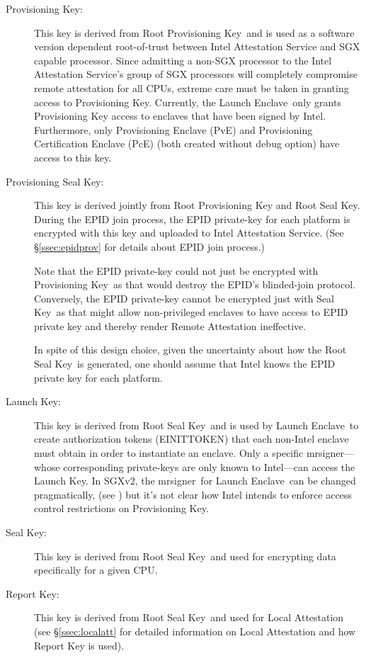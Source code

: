 \documentclass[letterpaper]{article}
\newcommand{\secref}[1]{\S\ref{#1}}
\newcommand{\mrsigner}{\textsf{mrsigner}}
\newcommand{\pve}{\textsf{PvE}}
\newcommand{\pce}{\textsf{PcE}}
\newcommand{\launchenclave}{\textsf{Launch Enclave}}
\newcommand{\rpk}{\textsf{Root Provisioning Key}}
\newcommand{\pk}{\textsf{Provisioning Key}}
\newcommand{\psk}{\textsf{Provisioning Seal Key}}
\newcommand{\rsk}{\textsf{Root Seal Key}}
\newcommand{\sk}{\textsf{Seal Key}}
\newcommand{\lk}{\textsf{Launch Key}}
\newcommand{\rk}{\textsf{Report Key}}
\begin{document}
  \begin{description}
  \item[\pk:] This key is derived from \rpk\ and is used as a software
    version dependent root-of-trust between Intel Attestation Service
    and SGX capable processor. Since admitting a non-SGX processor to
    the Intel Attestation Service's group of SGX processors will
    completely compromise remote attestation for all CPUs, extreme
    care must be taken in granting access to Provisioning
    Key. Currently, the \launchenclave\ only grants Provisioning Key
    access to enclaves that have been signed by Intel. Furthermore,
    only \textsf{Provisioning Enclave} (\pve) and Provisioning
    Certification Enclave (\pce) (both created without debug option)
    have access to this key.

  \item[\psk:] This key is derived jointly from Root Provisioning Key
    and Root Seal Key. During the EPID join process, the EPID
    private-key for each platform is encrypted with this key and
    uploaded to Intel Attestation Service. (See \secref{ssec:epidprov}
    for details about EPID join process.)

    Note that the EPID private-key could not just be encrypted with
    \pk\ as that would destroy the EPID's blinded-join
    protocol. Conversely, the EPID private-key cannot be encrypted
    just with \sk\ as that might allow non-privileged enclaves to have
    access to EPID private key and thereby render Remote Attestation
    ineffective.

    In spite of this design choice, given the uncertainty about how
    the \rsk\ is generated, one should assume that Intel knows the
    EPID private key for each platform.

  \item[\lk:] This key is derived from \rsk\ and is used by
    \launchenclave\ to create authorization tokens
    (\textsf{EINITTOKEN}) that each non-Intel enclave must obtain in
    order to instantiate an enclave. Only a specific \mrsigner---whose
    corresponding private-keys are only known to Intel---can access
    the \lk. In SGXv2, the \mrsigner\ for \launchenclave\ can be
    changed pragmatically, (see \cite[\S39.1.4]{intelsdm}) but it's
    not clear how Intel intends to enforce access control restrictions
    on \pk.

  \item[\sk:] This key is derived from \rsk\ and used for encrypting
    data specifically for a given CPU.

  \item[\rk:] This key is derived from \rsk\ and used for Local
    Attestation (see \secref{ssec:localatt} for detailed information
    on Local Attestation and how Report Key is used).

  \end{description}
\end{document}

